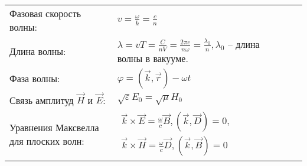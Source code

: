 \documentclass{article}
\begin{document}
\begin{tabular}{ |p{4.1cm}|p{5.4cm}|p{4.1cm}|p{4.4cm}|  }
                                                                             &  %
                                                                             \\ %
\hline
Фазовая скорость волны:                                                      &  %
$v = \frac{\omega}{k} = \frac{c}{n}$                                         &  %
                                                                             &  %
                                                                             \\ %
\hline
Длина волны:                                                                 &  %
$\lambda = vT = \frac{C}{nV} = \frac{2 \pi c}{n \omega} =
 \frac{\lambda_0}{n}, \lambda_0$ -- длина волны в вакууме.                   &  %
                                                                             &  %
                                                                             \\ %
\hline
Фаза волны:                                                                  &  %
$\varphi = (\vec{k}, \vec{r}) - \omega t$                                    &  %
                                                                             &  %
                                                                             \\ %
\hline
Связь амплитуд $\vec{H}$ и $\vec{E}$:                                        &  %
$\sqrt{\varepsilon} E_0 = \sqrt{\mu} H_0$                                    &  %
                                                                             &  %
                                                                             \\ %
\hline
Уравнения Максвелла для плоских волн:                                        &  %
$\begin{aligned}
\vec{k} \times \vec{E} = \frac{\omega}{c} \vec{B}, (\vec{k}, \vec{D}) = 0, \\
\vec{k} \times \vec{H} = \frac{\omega}{c} \vec{D}, (\vec{k}, \vec{B}) = 0
\end{aligned}$                                                               &  %
                                                                             &  %
                                                                             \\ %

\end{tabular}
\end{document}
